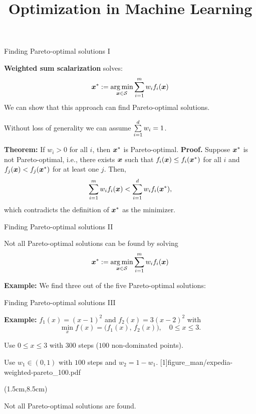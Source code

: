 \documentclass[11pt,compress,t,notes=noshow,xcolor=table]{beamer}
\title{Optimization in Machine Learning}
\begin{document}

\begin{framei}[sep=0.5em]{Finding Pareto-optimal solutions I}
\item \textbf{Weighted sum scalarization} solves:
$$\bm{x}^\ast := \mathop{\mathrm{arg\,min}}_{\bm{x} \in \mathcal{S} } \sum\limits_{i=1}^m w_i f_i(\bm{x})$$
We can show that this approach can find Pareto-optimal solutions.
\item Without loss of generality we can assume $\sum\limits_{i=1}^d w_i =1$.
\item \textbf{Theorem:} If $w_i>0$ for all $i$, then $\bm{x}^\ast$ is Pareto-optimal.
\spacer
\textbf{Proof.} Suppose $\bm{x}^\ast$ is not Pareto-optimal, i.e., there exists $\bm{x}$ such that $f_i(\bm{x}) \leq f_i(\bm{x}^\ast)$ for all $i$ and $f_j(\bm{x}) < f_j(\bm{x}^\ast)$ for at least one $j$. Then,
$$\sum\limits_{i=1}^m w_i f_i(\bm{x}) < \sum\limits_{i=1}^d w_i f_i(\bm{x}^\ast),$$
which contradicts the definition of $\bm{x}^\ast$ as the minimizer.
\end{framei}


\begin{framei}[sep=0.5em]{Finding Pareto-optimal solutions II}
\item Not all Pareto-optimal solutions can be found by solving
$$\bm{x}^\ast := \mathop{\mathrm{arg\,min}}_{\bm{x} \in \mathcal{S} } \sum\limits_{i=1}^m w_i f_i(\bm{x})$$
\item \textbf{Example:} We find three out of the five Pareto-optimal solutions:
\end{framei}


\begin{framei}[align=top, sep=0.5em]{Finding Pareto-optimal solutions III}
\item \textbf{Example:} $f_1(x) = (x-1)^2$ and $f_2(x) = 3(x-2)^2$ with
$$
\min_{x} f(x)
= \bigl(f_1(x),\, f_2(x)\bigr),
\quad 0 \le x \le 3.
$$
\item Use $0 \le x \le 3$ with $300$ steps ($100$ non-dominated points).
\item Use $w_1 \in (0,1)$ with $100$ steps and $w_2=1-w_1$.
\imageFixed{1cm}{4cm}[1]{figure_man/expedia-weighted-pareto_100.pdf}
\begin{textblock*}{\linewidth}(1.5cm,8.5cm)
\item Not all Pareto-optimal solutions are found.
\end{textblock*}
\end{framei}
\end{document}
